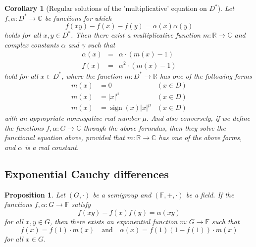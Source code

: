 \documentclass[a4paper,12pt]{article}
\theoremstyle{plain}
\newtheorem{cor}{Corollary}
\newtheorem{prop}{Proposition}
\theoremstyle{definition}
\theoremstyle{remark}
\begin{document}
\begin{cor}[Regular solutions of the 'multiplicative' equation on $D^{\ast}$]
 Let  $f, \alpha \colon D^{\ast} \to \mathbb{C}$ be functions for which 
 \[
  f(xy)-f(x)-f(y)= \alpha(x)\alpha(y)
 \]
 holds for all $x, y\in D^{\ast}$. Then there exist a multiplicative function $m\colon \mathbb{R}\to \mathbb{C}$ and complex constants 
 $\alpha$ and $\gamma$ such that 
 \[
 \begin{array}{rcl}
 \alpha(x)&=& \alpha\cdot (m(x)-1)\\
  f(x)&=& \alpha^{2}\cdot (m(x)-1)
  \end{array}
   \]
 hold for all $x\in D^{\ast}$, where the function $m\colon D^{\ast}\to \mathbb{R}$ has one of the following forms
 \begin{align*}
m(x)&=0 & (x\in D)\\
m(x)&= |x|^{\mu} & (x\in D)\\
m(x)&= \operatorname{sign}(x) |x|^{\mu} & (x\in D)
 \end{align*}
 with an appropriate nonnegative real number $\mu$.   And also conversely, if we define the functions $f, \alpha \colon G\to \mathbb{C}$ through the above formulas, then they solve the functional  equation above, provided that $m\colon \mathbb{R}\to \mathbb{C}$ has one of the above forms, and $\alpha$ is a real constant.  
\end{cor}



\subsection{Exponential Cauchy differences}


\begin{prop}\label{prop4}
 Let $(G, \cdot)$ be a semigroup and $(\mathbb{F}, +, \cdot)$ be a field. 
 If the functions $f, \alpha \colon G\to \mathbb{F}$ satisfy 
 \begin{equation}\label{exp_product}
 f(xy)-f(x)f(y)= \alpha(xy)  
 \end{equation}
for all $x, y\in G$, then there exists an exponential function $m\colon G\to \mathbb{F}$ such that 
\[
 f(x)= f(1)\cdot m(x)
 \quad 
 \text{and}
 \quad 
 \alpha(x)= f(1)(1-f(1))\cdot m(x)
\]
for all $x\in G$. 
\end{prop}
\end{document}
